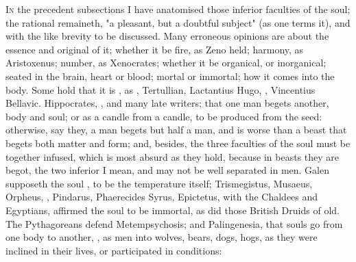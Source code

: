 \lettrine{I}{n} the precedent subsections I have anatomised those inferior
faculties of the soul; the rational remaineth, "a pleasant, but a doubtful
subject" (as one terms it), and with the like brevity to be
discussed. Many erroneous opinions are about the essence and original of it;
whether it be fire, as Zeno held; harmony, as Aristoxenus; number, as
Xenocrates; whether it be organical, or inorganical; seated in the brain, heart
or blood; mortal or immortal; how it comes into the body. Some hold that it is
, as , Tertullian,
Lactantius  Hugo,
, Vincentius Bellavic.
 Hippocrates,
\Avicenna{}, and many late writers; that one man begets
another, body and soul; or as a candle from a candle, to be produced from the
seed: otherwise, say they, a man begets but half a man, and is worse than a
beast that begets both matter and form; and, besides, the three faculties of
the soul must be together infused, which is most absurd as they hold, because
in beasts they are begot, the two inferior I mean, and may not be well
separated in men. Galen supposeth the soul , to be the temperature itself; Trismegistus, Musaeus, Orpheus, \Homer{},
Pindarus, Phaerecides Syrus, Epictetus, with the Chaldees and Egyptians,
affirmed the soul to be immortal, as did those British
Druids of old. The Pythagoreans defend
Metempsychosis; and Palingenesia, that souls go from one body to another,
, as men into wolves, bears, dogs, hogs, as they
were inclined in their lives, or participated in conditions:


